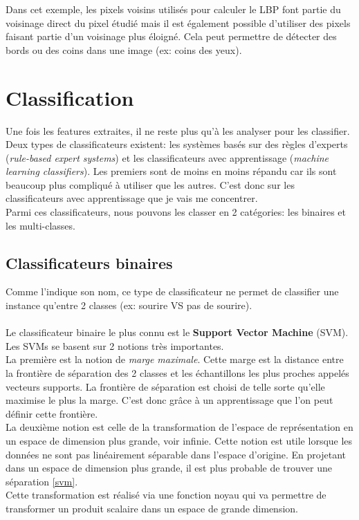 \documentclass[overfullbox, poster]{polytech/polytech}
\begin{document}
Dans cet exemple, les pixels voisins utilisés pour calculer le LBP font partie du voisinage direct du pixel étudié mais il est également possible d'utiliser des pixels faisant partie d'un voisinage plus éloigné. Cela peut permettre de détecter des bords ou des coins dans une image (ex: coins des yeux).

\newpage
\section{Classification}
Une fois les features extraites, il ne reste plus qu'à les analyser pour les classifier.\\
Deux types de classificateurs existent: les systèmes basés sur des règles d'experts (\textit{rule-based expert systems}) et les classificateurs avec apprentissage (\textit{machine learning classifiers}).
Les premiers sont de moins en moins répandu car ils sont beaucoup plus compliqué à utiliser que les autres. C'est donc sur les classificateurs avec apprentissage que je vais me concentrer.\\
Parmi ces classificateurs, nous pouvons les classer en 2 catégories: les binaires et les multi-classes.

\subsection{Classificateurs binaires}
Comme l'indique son nom, ce type de classificateur ne permet de classifier une instance qu'entre 2 classes (ex: sourire VS pas de sourire).\\
\\
Le classificateur binaire le plus connu est le \textbf{Support Vector Machine} (SVM).\\
Les SVMs se basent sur 2 notions très importantes.\\
La première est la notion de \textit{marge maximale}. Cette marge est la distance entre la frontière de séparation des 2 classes et les échantillons les plus proches appelés vecteurs supports. La frontière de séparation est choisi de telle sorte qu'elle maximise le plus la marge. C'est donc grâce à un apprentissage que l'on peut définir cette frontière.\\
La deuxième notion est celle de la transformation de l'espace de représentation en un espace de dimension plus grande, voir infinie. Cette notion est utile lorsque les données ne sont pas linéairement séparable dans l'espace d'origine. En projetant dans un espace de dimension plus grande, il est plus probable de trouver une séparation \autoref{svm}.\\
Cette transformation est réalisé via une fonction noyau qui va permettre de transformer un produit scalaire dans un espace de grande dimension.
\end{document}
